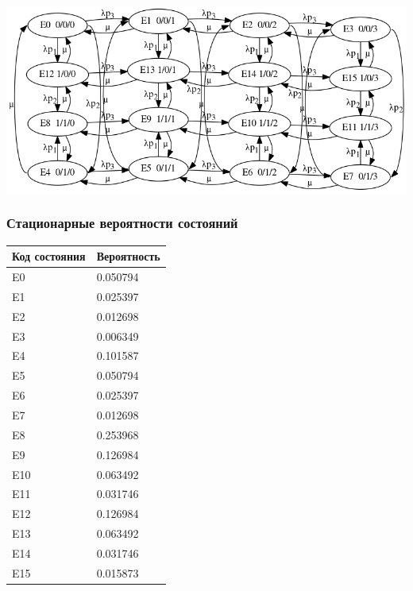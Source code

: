 \includegraphics[resolution=128]{img/g2.png}

\subsubsection{Стационарные вероятности состояний}

\begin{tabular}{|l|l|}
\hline
Код состояния & Вероятность \\ \hline
E0            & 0.050794      \\ \hline
E1            & 0.025397      \\ \hline
E2            & 0.012698      \\ \hline
E3            & 0.006349      \\ \hline
E4            & 0.101587      \\ \hline
E5            & 0.050794      \\ \hline
E6            & 0.025397      \\ \hline
E7            & 0.012698      \\ \hline
E8            & 0.253968      \\ \hline
E9            & 0.126984      \\ \hline
E10           & 0.063492      \\ \hline
E11           & 0.031746      \\ \hline
E12           & 0.126984      \\ \hline
E13           & 0.063492      \\ \hline
E14           & 0.031746      \\ \hline
E15           & 0.015873      \\ \hline
\end{tabular}

